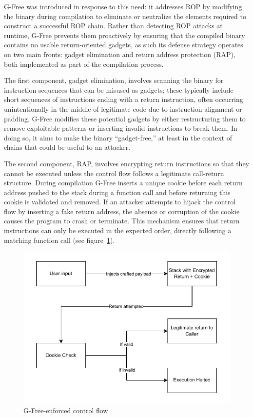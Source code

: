 \documentclass[a4paper]{usiinfbachelorproject}
\begin{document}
G-Free was introduced in response to this need: it addresses ROP by modifying the binary during compilation to eliminate or neutralize the elements required to construct a successful ROP chain. Rather than detecting ROP attacks at runtime, G-Free prevents them proactively by ensuring that the compiled binary contains no usable return-oriented gadgets, as such its defense strategy operates on two main fronts: gadget elimination and return address protection (RAP), both implemented as part of the compilation process.

The first component, gadget elimination, involves scanning the binary for instruction sequences that can be misused as gadgets; these typically include short sequences of instructions ending with a return instruction, often occurring unintentionally in the middle of legitimate code due to instruction alignment or padding. G-Free modifies these potential gadgets by either restructuring them to remove exploitable patterns or inserting invalid instructions to break them. In doing so, it aims to make the binary “gadget-free,” at least in the context of chains that could be useful to an attacker.

The second component, RAP, involves encrypting return instructions so that they cannot be executed unless the control flow follows a legitimate call-return structure. During compilation G-Free inserts a unique cookie before each return address pushed to the stack during a function call and before returning this cookie is validated and removed. If an attacker attempts to hijack the control flow by inserting a fake return address, the absence or corruption of the cookie causes the program to crash or terminate. This mechanism ensures that return instructions can only be executed in the expected order, directly following a matching function call (see figure~\ref{fig:rop_protected}).

\begin{figure}[h!]
	\centering
	\includegraphics[scale=1]{figures/ROP-Protected.pdf}
	\caption{G-Free-enforced control flow}
	\label{fig:rop_protected}
\end{figure}
\end{document}
